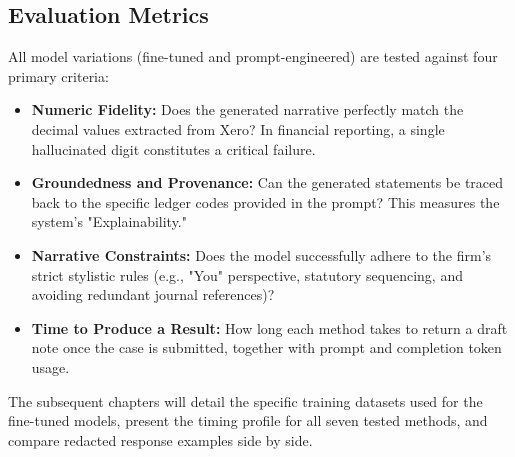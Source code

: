 \subsection{Evaluation Metrics}
All model variations (fine-tuned and prompt-engineered) are tested against four primary criteria:
\begin{itemize}
    \item \textbf{Numeric Fidelity:} Does the generated narrative perfectly match the decimal values extracted from Xero? In financial reporting, a single hallucinated digit constitutes a critical failure.
    \item \textbf{Groundedness and Provenance:} Can the generated statements be traced back to the specific ledger codes provided in the prompt? This measures the system's "Explainability."
    \item \textbf{Narrative Constraints:} Does the model successfully adhere to the firm's strict stylistic rules (e.g., "You" perspective, statutory sequencing, and avoiding redundant journal references)?
    \item \textbf{Time to Produce a Result:} How long each method takes to return a draft note once the case is submitted, together with prompt and completion token usage.
\end{itemize}
The subsequent chapters will detail the specific training datasets used for the fine-tuned models, present the timing profile for all seven tested methods, and compare redacted response examples side by side.
